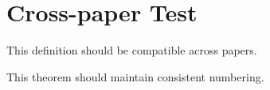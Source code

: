 \documentclass{article}
\begin{document}
\section{Cross-paper Test}
\begin{definition}
This definition should be compatible across papers.
\end{definition}
\begin{theorem}
This theorem should maintain consistent numbering.
\end{theorem}
\end{document}
